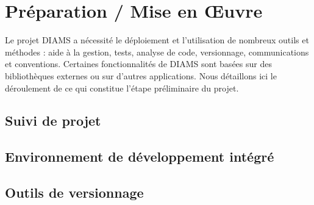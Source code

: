 \chapter{Préparation / Mise en Œuvre} %
Le projet DIAMS a nécessité le déploiement et l'utilisation de nombreux outils et méthodes : aide à la gestion,
tests, analyse de code, versionnage, communications et conventions. Certaines fonctionnalités de DIAMS sont basées sur des bibliothèques externes ou sur d'autres applications. Nous détaillons ici le déroulement de ce qui constitue l'étape préliminaire du projet.

\section{Suivi de projet}

\section{Environnement de développement intégré}

\section{Outils de versionnage}

